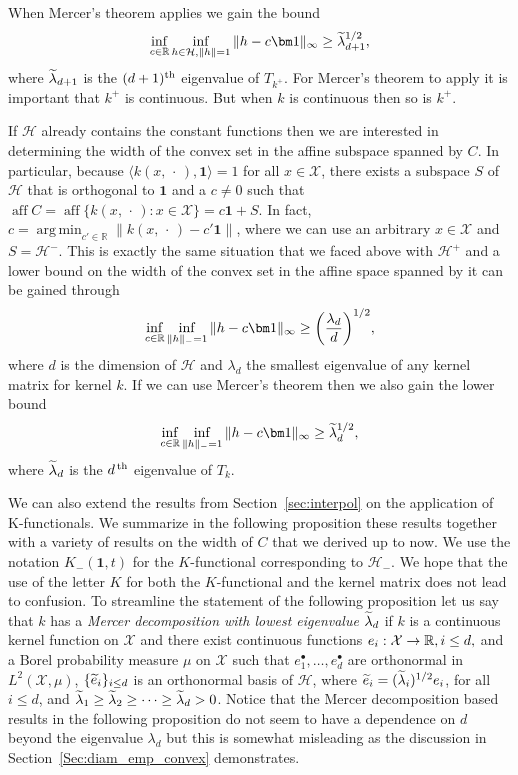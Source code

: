 \documentclass[10pt]{amsart}
\theoremstyle{definition}\newtheorem{defi}[theo]{Definition}\newtheorem{rema}[theo]{Remark}\newtheorem{exam}[theo]{Example}\newtheorem{exem}[theo]{Example}\newtheorem{nota}[theo]{Notation}
\theoremstyle{remark}
\DeclareMathOperator*{\argmin}{arg\,min}
\DeclareMathOperator{\aff}{aff}
\newcommand{\R}{\mathbb{R}}
\newcommand{\X}{\mathcal{X}}
\newcommand{\cH}{\mathcal{H}}
\let\oldtilde\tilde
\renewcommand*{\tilde}[1]{\mathchoice{\widetilde{#1}}{\widetilde{#1}}{\oldtilde{#1}}{\oldtilde{#1}}}
\renewcommand*{\to}{\mathchoice{\longrightarrow}{\rightarrow}{\rightarrow}{\rightarrow}}
\let\originalleft\left
\let\originalright\right
\renewcommand{\left}{\mathopen{}\mathclose\bgroup\originalleft}
\renewcommand{\right}{\aftergroup\egroup\originalright}
\begin{document}
When Mercer's theorem applies we gain the bound
\[
\inf_{c \in \R} \inf_{h \in \cH, \|h\|=1} \|h - c\bm 1\|_\infty \geq \tilde \lambda_{d+1}^{1/2},
\]
where $\tilde \lambda_{d+1}$ is the $(d+1)^{\rm th}$ eigenvalue of $T_{k^+}$. For Mercer's theorem to apply it is important that $k^+$ is continuous. But when $k$ is continuous then so is $k^+$.

If $\cH$ already contains the constant functions then we are interested in determining the width of the convex set in the affine subspace spanned by $C$. In particular, because $\langle k(x,\,\cdot\,), \bm 1 \rangle = 1$ for all $x \in \X$, there exists a subspace $S$ of $\cH$ that is orthogonal to $\bm 1$ and a $c \not = 0$ such that $\aff C = \aff \{k(x,\,\cdot\,) : x \in \X\} = c \bm 1 + S$. In fact, $c = \argmin_{c' \in \R} \| k(x,\,\cdot\,) - c' \bm 1\|$, where we can use an arbitrary $x \in \X$ and $S = \cH^-$. This is exactly the same situation that we faced above with $\cH^+$ and a lower bound on the width of the convex set in the affine space spanned by it can be gained through
\[
\inf_{c\in \R} \inf_{\|h\|_- = 1} \| h - c \bm 1 \|_\infty \geq \left(\frac{\lambda_d}{d} \right)^{1/2},
\]
\pagebreak{}
where $d$ is the dimension of $\cH$ and $\lambda_d$ the smallest eigenvalue of any kernel matrix for kernel $k$. If we can use Mercer's theorem then we also gain the lower bound
\[
\inf_{c \in \R} \inf_{\|h\|_- =1} \|h - c \bm 1 \|_\infty \geq \tilde \lambda_{d}^{1/2},
\]
where $\tilde \lambda_{d}$ is the $d^{\,\rm th}$ eigenvalue of $T_{k}$.


We can also extend the results from Section~\ref{sec:interpol} on the application of K-functionals. We summarize in the following proposition these results together with a variety of results on the width of $C$ that we derived up to now. We use the notation $K_-(\bm 1,t)$ for the $K$-functional corresponding to $\cH_-$. We hope that the use of the letter $K$ for both the $K$-functional and the kernel matrix does not lead to confusion. To streamline the statement of the following proposition let us say that $k$ has a \emph{Mercer decomposition with lowest eigenvalue $\tilde \lambda_d$} if $k$ is a continuous kernel function on $\X$ and there exist continuous functions $e_i: \X \to \R, i \leq d,$ and a Borel probability measure $\mu$ on $\X$ such that $e_1^\bullet,\dots, e_d^\bullet$ are orthonormal in $L^2(\X,\mu)$, $\{\tilde e_i\}_{i\leq d}$ is an orthonormal basis of $\cH$, where $\tilde e_i = (\tilde \lambda_i)^{1/2} e_i$, for all $i \leq d$, and $\tilde \lambda_1 \geq \tilde \lambda_2\geq \dots \geq \tilde \lambda_d>0$. Notice that the Mercer decomposition based results in the following proposition do not seem to have a dependence on $d$ beyond the eigenvalue $\lambda_d$ but this is somewhat misleading as the discussion in Section~\ref{Sec:diam_emp_convex} demonstrates.
\end{document}
